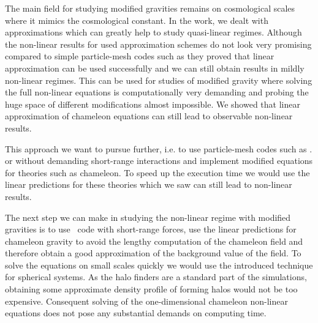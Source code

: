 The main field for studying modified gravities remains on cosmological scales where it mimics the cosmological constant. In the work, we dealt with approximations which can greatly help to study quasi-linear regimes. Although the non-linear results for used approximation schemes do not look very promising compared to simple particle-mesh codes such as  they proved that linear approximation can be used successfully and we can still obtain results in mildly non-linear regimes. This can be used for studies of modified gravity where solving the full non-linear equations is computationally very demanding and probing the huge space of different modifications almost impossible. We showed that linear approximation of chameleon equations can still lead to observable non-linear results.

This approach we want to pursue further, i.e. to use particle-mesh codes such as .  or  without demanding short-range interactions and implement modified equations for theories such as chameleon. To speed up the execution time we would use the linear predictions for these theories which we saw can still lead to non-linear results.

The next step we can make in studying the non-linear regime with modified gravities is to use \nbody\ code with short-range forces, use the linear predictions for chameleon gravity to avoid the lengthy computation of the chameleon field and therefore obtain a good approximation of the background value of the field. To solve the equations on small scales quickly we would use the introduced technique for spherical systems. As the halo finders are a standard part of the simulations, obtaining some approximate density profile of forming halos would not be too expensive. Consequent solving of the one-dimensional chameleon non-linear equations does not pose any substantial demands on computing time.